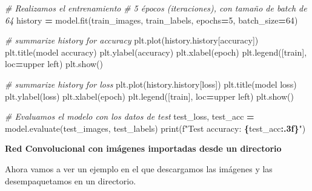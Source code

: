\documentclass[
  a4paper,
  DIV=11,
  numbers=noendperiod]{scrreprt}
\newenvironment{Shaded}{\begin{snugshade}}{\end{snugshade}}
\newcommand{\BuiltInTok}[1]{#1}
\newcommand{\CommentTok}[1]{\textcolor[rgb]{0.56,0.35,0.01}{\textit{#1}}}
\newcommand{\DecValTok}[1]{\textcolor[rgb]{0.00,0.00,0.81}{#1}}
\newcommand{\NormalTok}[1]{#1}
\newcommand{\OperatorTok}[1]{\textcolor[rgb]{0.81,0.36,0.00}{\textbf{#1}}}
\newcommand{\SpecialCharTok}[1]{\textcolor[rgb]{0.81,0.36,0.00}{\textbf{#1}}}
\newcommand{\SpecialStringTok}[1]{\textcolor[rgb]{0.31,0.60,0.02}{#1}}
\newcommand{\StringTok}[1]{\textcolor[rgb]{0.31,0.60,0.02}{#1}}
\begin{document}
\begin{Shaded}
\begin{Highlighting}[numbers=left,,]
\CommentTok{\# Realizamos el entrenamiento}
\CommentTok{\# 5 épocos (iteraciones), con tamaño de batch de 64}
\NormalTok{history }\OperatorTok{=}\NormalTok{ model.fit(train\_images, train\_labels, epochs}\OperatorTok{=}\DecValTok{5}\NormalTok{, batch\_size}\OperatorTok{=}\DecValTok{64}\NormalTok{)}


\CommentTok{\# summarize history for accuracy}
\NormalTok{plt.plot(history.history[}\StringTok{\textquotesingle{}accuracy\textquotesingle{}}\NormalTok{])}
\NormalTok{plt.title(}\StringTok{\textquotesingle{}model accuracy\textquotesingle{}}\NormalTok{)}
\NormalTok{plt.ylabel(}\StringTok{\textquotesingle{}accuracy\textquotesingle{}}\NormalTok{)}
\NormalTok{plt.xlabel(}\StringTok{\textquotesingle{}epoch\textquotesingle{}}\NormalTok{)}
\NormalTok{plt.legend([}\StringTok{\textquotesingle{}train\textquotesingle{}}\NormalTok{], loc}\OperatorTok{=}\StringTok{\textquotesingle{}upper left\textquotesingle{}}\NormalTok{)}
\NormalTok{plt.show()}

\CommentTok{\# summarize history for loss}
\NormalTok{plt.plot(history.history[}\StringTok{\textquotesingle{}loss\textquotesingle{}}\NormalTok{])}
\NormalTok{plt.title(}\StringTok{\textquotesingle{}model loss\textquotesingle{}}\NormalTok{)}
\NormalTok{plt.ylabel(}\StringTok{\textquotesingle{}loss\textquotesingle{}}\NormalTok{)}
\NormalTok{plt.xlabel(}\StringTok{\textquotesingle{}epoch\textquotesingle{}}\NormalTok{)}
\NormalTok{plt.legend([}\StringTok{\textquotesingle{}train\textquotesingle{}}\NormalTok{], loc}\OperatorTok{=}\StringTok{\textquotesingle{}upper left\textquotesingle{}}\NormalTok{)}
\NormalTok{plt.show()}

\CommentTok{\# Evaluamos el modelo con los datos de test}
\NormalTok{test\_loss, test\_acc }\OperatorTok{=}\NormalTok{ model.evaluate(test\_images, test\_labels)}
\BuiltInTok{print}\NormalTok{(}\SpecialStringTok{f"Test accuracy: }\SpecialCharTok{\{}\NormalTok{test\_acc}\SpecialCharTok{:.3f\}}\SpecialStringTok{"}\NormalTok{)}
\end{Highlighting}
\end{Shaded}

\textbf{Red Convolucional con imágenes importadas desde un directorio}

Ahora vamos a ver un ejemplo en el que descargamos las imágenes y las
desempaquetamos en un directorio.
\end{document}
